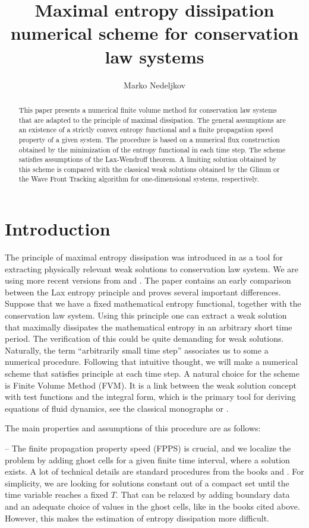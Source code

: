 \documentclass[11pt,a4paper,reqno]{amsart}
\title[Maximal entropy dissipation numerical scheme]{Maximal entropy 
dissipation numerical scheme for conservation law
systems}
\author{Marko Nedeljkov}
\date{}
\theoremstyle{plain}
\theoremstyle{definition}
\theoremstyle{remark}
\numberwithin{equation}{section}
\begin{document}
\maketitle	
\begin{abstract}
This paper presents a numerical finite volume method for conservation law 
systems that are adapted to the principle of maximal dissipation. 
The general assumptions are an existence
of a strictly convex entropy functional and a finite propagation speed 
property of a given system. The procedure is based on a numerical flux
construction obtained by the minimization of the entropy functional
in each time step. The scheme satisfies assumptions
of the Lax-Wendroff theorem.  
A limiting solution obtained by this scheme is compared with the classical
weak solutions obtained by the Glimm or the Wave Front Tracking algorithm
for one-dimensional systems, respectively. 
\end{abstract}
\section{Introduction}
The principle of maximal entropy dissipation was introduced in \cite{CD_1973} 
as a tool for extracting physically relevant weak solutions to 
conservation law system. We are using more recent versions from 
\cite{CD_2012} and \cite{F2014}. The paper \cite{Hsiao} contains an early
comparison between the Lax entropy principle and proves several important differences. 
Suppose that we have a fixed mathematical 
entropy functional, together with the conservation law system. Using
this principle one can extract a weak solution that maximally dissipates 
the mathematical entropy in an arbitrary short time period.
The verification of this could be quite demanding for weak solutions.
Naturally, the term ``arbitrarily  small time step'' associates us to some  
a numerical procedure. Following that intuitive thought, we will make 
a numerical scheme that satisfies 
principle at each time step. A natural choice for the scheme is
Finite Volume Method (FVM). It is a link between the weak solution concept with test 
functions and the integral form, which is the primary tool for deriving
equations of fluid dynamics, see the classical monographs
\cite{Batchelor} or \cite{MarsdenChorin}. 
\medskip

The main properties and assumptions of this procedure are as follows:
\medskip 

\noindent -- The finite propagation property speed (FPPS) is crucial, 
and we localize the problem
by adding ghost cells for a given finite time interval, 
where a solution exists. A lot
of technical details are standard procedures from the books 
\cite{GR} and \cite{leveque}. For simplicity,
we are looking for solutions constant out of a compact set until the time 
variable reaches a fixed $T$. That can be relaxed by adding 
boundary data and an adequate choice
of values in the ghost cells, like in the books cited above.
However, this makes the estimation of entropy dissipation more difficult.
\medskip 
\end{document}

